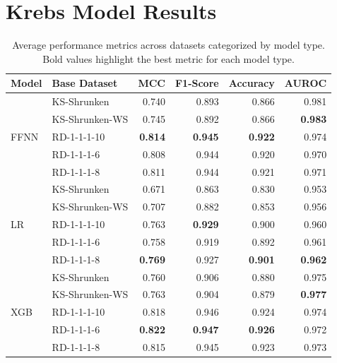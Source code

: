 \section{Krebs Model Results}
\label{sec:krebs_model_results}

\begin{table}[ht]
	\centering
	\small
	\begin{tabular}{llrrrr}
		\toprule
		Model                    & Base Dataset   & MCC            & F1-Score       & Accuracy       & AUROC          \\
		\midrule
		\multirow[t]{5}{*}{FFNN} & KS-Shrunken    & 0.740          & 0.893          & 0.866          & 0.981          \\
		                         & KS-Shrunken-WS & 0.745          & 0.892          & 0.866          & \textbf{0.983} \\
		                         & RD-1-1-1-10    & \textbf{0.814} & \textbf{0.945} & \textbf{0.922} & 0.974          \\
		                         & RD-1-1-1-6     & 0.808          & 0.944          & 0.920          & 0.970          \\
		                         & RD-1-1-1-8     & 0.811          & 0.944          & 0.921          & 0.971          \\\midrule
		\multirow[t]{5}{*}{LR}   & KS-Shrunken    & 0.671          & 0.863          & 0.830          & 0.953          \\
		                         & KS-Shrunken-WS & 0.707          & 0.882          & 0.853          & 0.956          \\
		                         & RD-1-1-1-10    & 0.763          & \textbf{0.929} & 0.900          & 0.960          \\
		                         & RD-1-1-1-6     & 0.758          & 0.919          & 0.892          & 0.961          \\
		                         & RD-1-1-1-8     & \textbf{0.769} & 0.927          & \textbf{0.901} & \textbf{0.962} \\\midrule
		\multirow[t]{5}{*}{XGB}  & KS-Shrunken    & 0.760          & 0.906          & 0.880          & 0.975          \\
		                         & KS-Shrunken-WS & 0.763          & 0.904          & 0.879          & \textbf{0.977} \\
		                         & RD-1-1-1-10    & 0.818          & 0.946          & 0.924          & 0.974          \\
		                         & RD-1-1-1-6     & \textbf{0.822} & \textbf{0.947} & \textbf{0.926} & 0.972          \\
		                         & RD-1-1-1-8     & 0.815          & 0.945          & 0.923          & 0.973          \\
		\bottomrule
	\end{tabular}
	\caption[Average performance metrics across \krebsADataSetText datasets categorized by model type.]{Average performance metrics across \krebsADataSetText datasets categorized by model type. Bold values
		highlight the best metric for each model type.}
	\label{tab:mdoe_performance_krebs_model_type}
\end{table}

